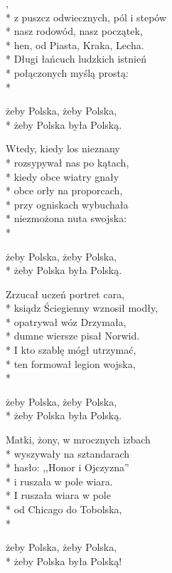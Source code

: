 \begin{lyrics}[longestline={Z głębi dziejów, z krain mrocznych,}]

,\\*
z puszcz odwiecznych, pól i stepów\\*
nasz rodowód, nasz początek,\\*
hen, od Piasta, Kraka, Lecha.\\*
\vin Długi łańcuch ludzkich istnień\\*
\vin połączonych myślą prostą:\\*
\begin{markverses}[atwidthof={\vin żeby Polska, żeby Polska,}]%
\vin żeby Polska, żeby Polska,\\*
\vin żeby Polska była Polską.
\end{markverses}

Wtedy, kiedy los nieznany\\*
rozsypywał nas po kątach,\\*
kiedy obce wiatry gnały\\*
obce orły na proporcach,\\*
\vin przy ogniskach wybuchała\\*
\vin niezmożona nuta swojska:\\*
\begin{markverses}[atwidthof={\vin żeby Polska, żeby Polska,}]%
\vin żeby Polska, żeby Polska,\\*
\vin żeby Polska była Polską.
\end{markverses}

Zrzucał uczeń portret cara,\\*
ksiądz Ściegienny wznosił modły,\\*
opatrywał wóz Drzymała,\\*
dumne wiersze pisał Norwid.\\*
\vin I kto szablę mógł utrzymać,\\*
\vin ten formował legion wojska,\\*
\begin{markverses}[atwidthof={\vin żeby Polska, żeby Polska,}]%
\vin żeby Polska, żeby Polska,\\*
\vin żeby Polska była Polską.
\end{markverses}

Matki, żony, w mrocznych izbach\\*
wyszywały na sztandarach\\*
hasło: ,,Honor i Ojczyzna''\\*
i ruszała w pole wiara.\\*
\vin I ruszała wiara w pole\\*
\vin od Chicago do Tobolska,\\*
\begin{markverses}[atwidthof={\vin żeby Polska, żeby Polska,}, marktext={\markstyle$\times4$}]%
\vin żeby Polska, żeby Polska,\\*
\vin żeby Polska była Polską!
\end{markverses}
\end{lyrics}


